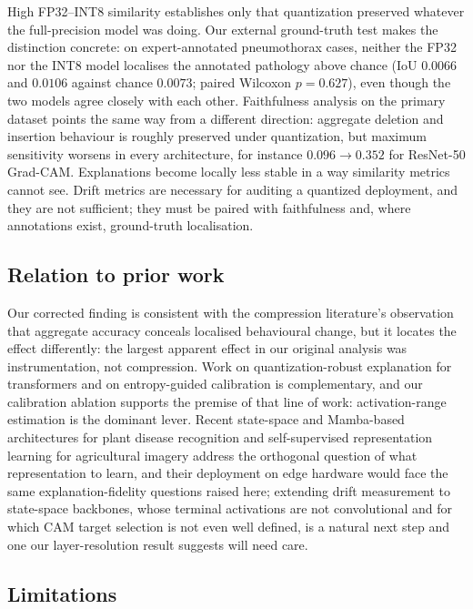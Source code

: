 \documentclass[fleqn,10pt]{wlscirep}
\begin{document}
High FP32--INT8 similarity establishes only that quantization preserved whatever the full-precision model was doing. Our external ground-truth test makes the distinction concrete: on expert-annotated pneumothorax cases, neither the FP32 nor the INT8 model localises the annotated pathology above chance (IoU $0.0066$ and $0.0106$ against chance $0.0073$; paired Wilcoxon $p = 0.627$), even though the two models agree closely with each other. Faithfulness analysis on the primary dataset points the same way from a different direction: aggregate deletion and insertion behaviour is roughly preserved under quantization, but maximum sensitivity worsens in every architecture, for instance $0.096 \rightarrow 0.352$ for ResNet-50 Grad-CAM. Explanations become locally less stable in a way similarity metrics cannot see. Drift metrics are necessary for auditing a quantized deployment, and they are not sufficient; they must be paired with faithfulness and, where annotations exist, ground-truth localisation.

\subsection*{Relation to prior work}

Our corrected finding is consistent with the compression literature's observation that aggregate accuracy conceals localised behavioural change\cite{Hooker2020compressed}, but it locates the effect differently: the largest apparent effect in our original analysis was instrumentation, not compression. Work on quantization-robust explanation for transformers\cite{Ranjan2024lrpqvit,Ranjan2025mixqvit} and on entropy-guided calibration\cite{Qin2025entropy,Lysov2022entropy} is complementary, and our calibration ablation supports the premise of that line of work: activation-range estimation is the dominant lever. Recent state-space and Mamba-based architectures for plant disease recognition\cite{AlMamun2026conmamba,AlMamun2025psmamba} and self-supervised representation learning for agricultural imagery\cite{AlMamun2024access,AlMamun2026statespacssl} address the orthogonal question of what representation to learn, and their deployment on edge hardware would face the same explanation-fidelity questions raised here; extending drift measurement to state-space backbones, whose terminal activations are not convolutional and for which CAM target selection is not even well defined, is a natural next step and one our layer-resolution result suggests will need care.

\subsection*{Limitations}
\end{document}
